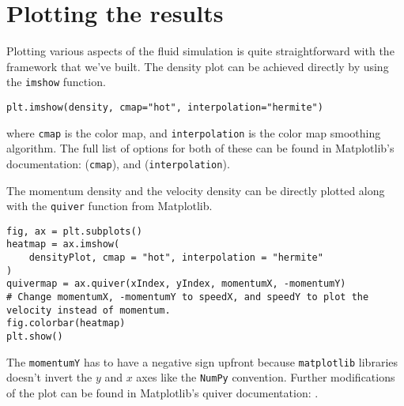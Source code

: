 \section{Plotting the results}

Plotting various aspects of the fluid simulation is quite straightforward with the framework that we've built. The density plot can be achieved directly by using the \texttt{imshow} function. \cite{matplotlib-imshow}
\begin{verbatim}
plt.imshow(density, cmap="hot", interpolation="hermite")
\end{verbatim}
where \texttt{cmap} is the color map, and \texttt{interpolation} is the color map smoothing algorithm. The full list of options for both of these can be found in Matplotlib's documentation: \cite{matplotlib-cmap} (\texttt{cmap}), and \cite{matplotlib-interpolation} (\texttt{interpolation}).

The momentum density and the velocity density can be directly plotted along with the \texttt{quiver} function from Matplotlib. \cite{matplotlib-quiver}
\begin{verbatim}
fig, ax = plt.subplots()
heatmap = ax.imshow(
    densityPlot, cmap = "hot", interpolation = "hermite"
)
quivermap = ax.quiver(xIndex, yIndex, momentumX, -momentumY)
# Change momentumX, -momentumY to speedX, and speedY to plot the velocity instead of momentum.
fig.colorbar(heatmap)
plt.show()
\end{verbatim}
The \texttt{momentumY} has to have a negative sign upfront because \texttt{matplotlib} libraries doesn't invert the $y$ and $x$ axes like the \texttt{NumPy} convention. Further modifications of the plot can be found in Matplotlib's quiver documentation: \cite{matplotlib-quiver}.
